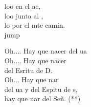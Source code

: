 \begin{cancion}
	loo en el ae,\\
	loo junto al ,\\
	lo  por el mte camin.\\jump\\
	\begin{chorus}%
	Oh.... Hay que nacer del ua\\
	Oh.... Hay que nacer\\
	del Esritu de D. \\
	Oh... Hay que nar\\
	del ua y del Espitu de s,\\
	hay que nar del Señ. (**) \\
	\end{chorus}%
	\jump\\
\end{cancion}%

